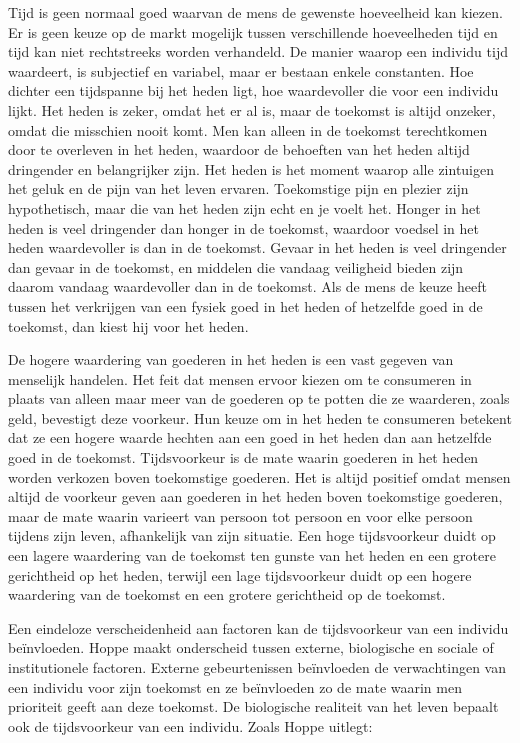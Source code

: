 \documentclass[
  a5paper,
  smalldemyvopaper,11pt,twoside,onecolumn,openright,extrafontsizes,
hidelinks]{memoir}
\begin{document}
Tijd is geen normaal goed waarvan de mens de gewenste hoeveelheid kan
kiezen. Er is geen keuze op de markt mogelijk tussen verschillende
hoeveelheden tijd en tijd kan niet rechtstreeks worden verhandeld. De
manier waarop een individu tijd waardeert, is subjectief en variabel,
maar er bestaan enkele constanten. Hoe dichter een tijdspanne bij het
heden ligt, hoe waardevoller die voor een individu lijkt. Het heden is
zeker, omdat het er al is, maar de toekomst is altijd onzeker, omdat die
misschien nooit komt. Men kan alleen in de toekomst terechtkomen door te
overleven in het heden, waardoor de behoeften van het heden altijd
dringender en belangrijker zijn. Het heden is het moment waarop alle
zintuigen het geluk en de pijn van het leven ervaren. Toekomstige pijn
en plezier zijn hypothetisch, maar die van het heden zijn echt en je
voelt het. Honger in het heden is veel dringender dan honger in de
toekomst, waardoor voedsel in het heden waardevoller is dan in de
toekomst. Gevaar in het heden is veel dringender dan gevaar in de
toekomst, en middelen die vandaag veiligheid bieden zijn daarom vandaag
waardevoller dan in de toekomst. Als de mens de keuze heeft tussen het
verkrijgen van een fysiek goed in het heden of hetzelfde goed in de
toekomst, dan kiest hij voor het heden.

De hogere waardering van goederen in het heden is een vast gegeven van
menselijk handelen. Het feit dat mensen ervoor kiezen om te consumeren
in plaats van alleen maar meer van de goederen op te potten die ze
waarderen, zoals geld, bevestigt deze voorkeur. Hun keuze om in het
heden te consumeren betekent dat ze een hogere waarde hechten aan een
goed in het heden dan aan hetzelfde goed in de toekomst. Tijdsvoorkeur
is de mate waarin goederen in het heden worden verkozen boven
toekomstige goederen. Het is altijd positief omdat mensen altijd de
voorkeur geven aan goederen in het heden boven toekomstige goederen,
maar de mate waarin varieert van persoon tot persoon en voor elke
persoon tijdens zijn leven, afhankelijk van zijn situatie. Een hoge
tijdsvoorkeur duidt op een lagere waardering van de toekomst ten gunste
van het heden en een grotere gerichtheid op het heden, terwijl een lage
tijdsvoorkeur duidt op een hogere waardering van de toekomst en een
grotere gerichtheid op de toekomst.

Een eindeloze verscheidenheid aan factoren kan de tijdsvoorkeur van een
individu beïnvloeden. Hoppe maakt onderscheid tussen externe,
biologische en sociale of institutionele factoren. Externe
gebeurtenissen beïnvloeden de verwachtingen van een individu voor zijn
toekomst en ze beïnvloeden zo de mate waarin men prioriteit geeft aan
deze toekomst. De biologische realiteit van het leven bepaalt ook de
tijdsvoorkeur van een individu. Zoals Hoppe uitlegt:
\end{document}

